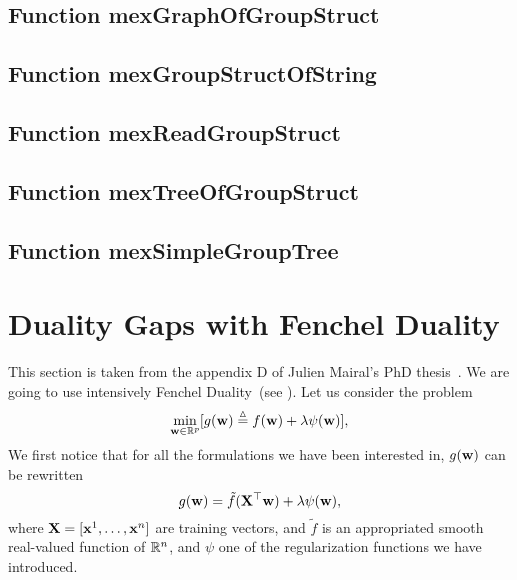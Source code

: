 \documentclass[a4paper, 11pt]{article}
\begin{document}
\subsection{Function mexGraphOfGroupStruct}

\subsection{Function mexGroupStructOfString}

\subsection{Function mexReadGroupStruct}

\subsection{Function mexTreeOfGroupStruct}

\subsection{Function mexSimpleGroupTree}


\appendix

\section{Duality Gaps with Fenchel Duality}\label{appendix}
This section is taken from the appendix D of Julien Mairal's PhD thesis~\cite{mairal11}.
We are going to use intensively Fenchel Duality~(see \cite{borwein}).
Let us consider the problem
\begin{equation}
\min_{{\mathbf w} \in {\mathbb R}^p} [g({\mathbf w}) \stackrel{\vartriangle}{=} f({\mathbf w}) + \lambda\psi({\mathbf w})],\label{software:eq:prb}
\end{equation}
We first notice that for all the formulations we have been
interested in, $g({\mathbf w})$ can be rewritten
\begin{equation}
g({\mathbf w}) = \tilde{f}({\mathbf X}^\top{\mathbf w}) + \lambda\psi({\mathbf w}), \label{software:eq:prb2}
\end{equation}
where ${\mathbf X}=[{\mathbf x}^1,\ldots,{\mathbf x}^n]$ are training vectors, and $\tilde{f}$ is an
appropriated smooth real-valued function of ${\mathbb R}^n$,
             and $\psi$ one of the regularization functions we have introduced.
\end{document}
